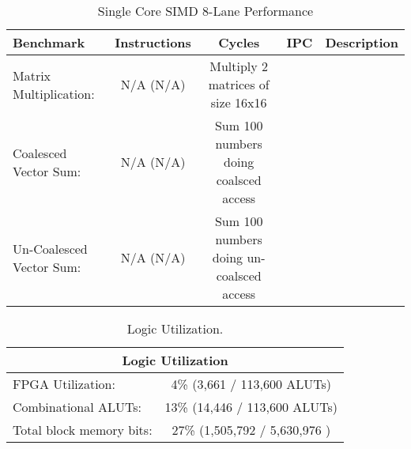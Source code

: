 \begin{table}[!htbp]
  \centering
  \begin{tabular}{|l|c|c|c|c|}
    \hline
Benchmark		&Instructions 	&Cycles		&IPC		&Description\\
    \hline
Matrix Multiplication:					&N/A (N/A) &Multiply 2 matrices of size 16x16 \\
Coalesced Vector Sum:					&N/A (N/A) &Sum 100 numbers doing coalsced access\\
Un-Coalesced Vector Sum:				&N/A (N/A) &Sum 100 numbers doing un-coalsced access\\
    \hline
  \end{tabular}
  \caption{Single Core SIMD 8-Lane Performance}
  \label{table:perf3}
\end{table}

\begin{table}[!htbp]
  \centering
  \begin{tabular}{|l|c|}
    \hline
    \multicolumn{2}{|c|}{Logic Utilization} \\
    \hline
FPGA Utilization:				&4\%  (3,661 / 113,600 ALUTs)\\
Combinational ALUTs:			&13\%       (14,446 / 113,600 ALUTs)\\
Total block memory bits:	&27\%   (1,505,792 / 5,630,976 )\\
    \hline
  \end{tabular}
  \caption{Logic Utilization.}
  \label{table:fpga_util3}
\end{table}
